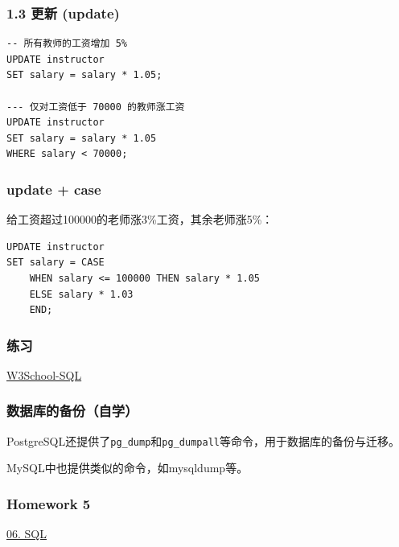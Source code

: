 \documentclass[aspectratio=169, 14pt]{beamer}
\begin{document}
\begin{frame}[fragile]
    \frametitle{1.3 更新 (update)}

    \begin{verbatim}
-- 所有教师的工资增加 5%
UPDATE instructor
SET salary = salary * 1.05;

--- 仅对工资低于 70000 的教师涨工资
UPDATE instructor
SET salary = salary * 1.05
WHERE salary < 70000;
    \end{verbatim}

\end{frame}
\begin{frame}[fragile]
    \frametitle{update + case}

给工资超过100000的老师涨3\%工资，其余老师涨5\%：

\begin{verbatim}
UPDATE instructor
SET salary = CASE
    WHEN salary <= 100000 THEN salary * 1.05
    ELSE salary * 1.03
    END;
\end{verbatim}


\end{frame}

\begin{frame}
    \frametitle{练习}
\href{https://www.w3school.com.cn/quiz/quiz.asp?quiz=sql}{W3School-SQL}
\end{frame}

\begin{frame}
    \frametitle{数据库的备份（自学）}
PostgreSQL还提供了\texttt{pg\_dump}和\texttt{pg\_dumpall}等命令，用于数据库的备份与迁移。

MySQL中也提供类似的命令，如{mysqldump}等。


\end{frame}

\begin{frame}
    \frametitle{Homework 5}

\href{https://github.com/ChenZhongPu/db-swufe/tree/master/06_sql}{06. SQL}
    
\end{frame}
\end{document}
